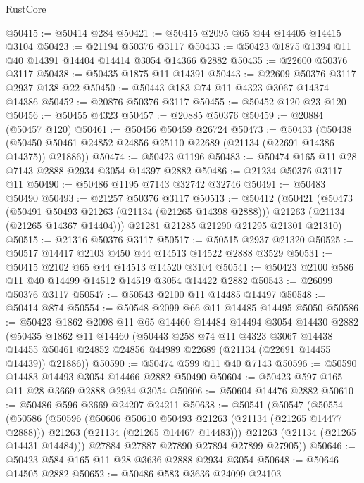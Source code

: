 \begin{lexlean}{RustCore}
\begin{coremodule}
@50415 := @50414 @284
@50421 := @50415 @2095 @65 @44 @14405 @14415 @3104
@50423 := @21194 @50376 @3117
@50433 := @50423 @1875 @1394 @11 @40 @14391 @14404 @14414 @3054 @14366 @2882
@50435 := @22600 @50376 @3117
@50438 := @50435 @1875 @11 @14391
@50443 := @22609 @50376 @3117 @2937 @138 @22
@50450 := @50443 @183 @74 @11 @4323 @3067 @14374 @14386
@50452 := @20876 @50376 @3117
@50455 := @50452 @120 @23 @120
@50456 := @50455 @4323
@50457 := @20885 @50376
@50459 := @20884 (@50457 @120)
@50461 := @50456 @50459 @26724
@50473 := @50433
    (@50438 (@50450 @50461 @24852 @24856 @25110 @22689 (@21134 (@22691 @14386 @14375)) @21886))
@50474 := @50423 @1196
@50483 := @50474 @165 @11 @28 @7143 @2888 @2934 @3054 @14397 @2882
@50486 := @21234 @50376 @3117 @11
@50490 := @50486 @1195 @7143 @32742 @32746
@50491 := @50483 @50490
@50493 := @21257 @50376 @3117
@50513 := @50412
    (@50421
      (@50473
        (@50491 @50493 @21263 (@21134 (@21265 @14398 @2888)))
        @21263
        (@21134 (@21265 @14367 @14404)))
      @21281
      @21285
      @21290
      @21295
      @21301
      @21310)
@50515 := @21316 @50376 @3117
@50517 := @50515 @2937 @21320
@50525 := @50517 @14417 @2103 @450 @44 @14513 @14522 @2888 @3529
@50531 := @50415 @2102 @65 @44 @14513 @14520 @3104
@50541 := @50423 @2100 @586 @11 @40 @14499 @14512 @14519 @3054 @14422 @2882
@50543 := @26099 @50376 @3117
@50547 := @50543 @2100 @11 @14485 @14497
@50548 := @50414 @874
@50554 := @50548 @2099 @66 @11 @14485 @14495 @5050
@50586 := @50423
    @1862
    @2098
    @11
    @65
    @14460
    @14484
    @14494
    @3054
    @14430
    @2882
    (@50435
      @1862
      @11
      @14460
      (@50443
        @258
        @74
        @11
        @4323
        @3067
        @14438
        @14455
        @50461
        @24852
        @24856
        @44989
        @22689
        (@21134 (@22691 @14455 @14439))
        @21886))
@50590 := @50474 @599 @11 @40 @7143
@50596 := @50590 @14483 @14493 @3054 @14466 @2882 @50490
@50604 := @50423 @597 @165 @11 @28 @3669 @2888 @2934 @3054
@50606 := @50604 @14476 @2882
@50610 := @50486 @596 @3669 @24207 @24211
@50638 := @50541
    (@50547
      (@50554
        (@50586
          (@50596
            (@50606 @50610 @50493 @21263 (@21134 (@21265 @14477 @2888)))
            @21263
            (@21134 (@21265 @14467 @14483)))
          @21263
          (@21134 (@21265 @14431 @14484)))
        @27884
        @27887
        @27890
        @27894
        @27899
        @27905))
@50646 := @50423 @584 @165 @11 @28 @3636 @2888 @2934 @3054
@50648 := @50646 @14505 @2882
@50652 := @50486 @583 @3636 @24099 @24103

\end{coremodule}
\end{lexlean}
